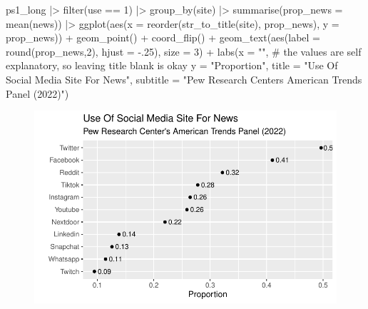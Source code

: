 \documentclass[
  letterpaper,
  DIV=11,
  numbers=noendperiod]{scrartcl}
\newenvironment{Shaded}{\begin{snugshade}}{\end{snugshade}}
\newcommand{\AttributeTok}[1]{\textcolor[rgb]{0.40,0.45,0.13}{#1}}
\newcommand{\CommentTok}[1]{\textcolor[rgb]{0.37,0.37,0.37}{#1}}
\newcommand{\DecValTok}[1]{\textcolor[rgb]{0.68,0.00,0.00}{#1}}
\newcommand{\FunctionTok}[1]{\textcolor[rgb]{0.28,0.35,0.67}{#1}}
\newcommand{\NormalTok}[1]{\textcolor[rgb]{0.00,0.23,0.31}{#1}}
\newcommand{\SpecialCharTok}[1]{\textcolor[rgb]{0.37,0.37,0.37}{#1}}
\newcommand{\StringTok}[1]{\textcolor[rgb]{0.13,0.47,0.30}{#1}}
\begin{document}
\begin{Shaded}
\begin{Highlighting}[]
\NormalTok{ps1\_long }\SpecialCharTok{|\textgreater{}} 
  \FunctionTok{filter}\NormalTok{(use }\SpecialCharTok{==} \DecValTok{1}\NormalTok{) }\SpecialCharTok{|\textgreater{}} 
  \FunctionTok{group\_by}\NormalTok{(site) }\SpecialCharTok{|\textgreater{}} 
  \FunctionTok{summarise}\NormalTok{(}\AttributeTok{prop\_news =} \FunctionTok{mean}\NormalTok{(news)) }\SpecialCharTok{|\textgreater{}} 
  \FunctionTok{ggplot}\NormalTok{(}\FunctionTok{aes}\NormalTok{(}\AttributeTok{x =} \FunctionTok{reorder}\NormalTok{(}\FunctionTok{str\_to\_title}\NormalTok{(site), prop\_news), }
             \AttributeTok{y =}\NormalTok{ prop\_news)) }\SpecialCharTok{+} 
  \FunctionTok{geom\_point}\NormalTok{() }\SpecialCharTok{+}
  \FunctionTok{coord\_flip}\NormalTok{() }\SpecialCharTok{+}
  \FunctionTok{geom\_text}\NormalTok{(}\FunctionTok{aes}\NormalTok{(}\AttributeTok{label =} \FunctionTok{round}\NormalTok{(prop\_news,}\DecValTok{2}\NormalTok{), }\AttributeTok{hjust =} \SpecialCharTok{{-}}\NormalTok{.}\DecValTok{25}\NormalTok{), }\AttributeTok{size =} \DecValTok{3}\NormalTok{) }\SpecialCharTok{+}
  \FunctionTok{labs}\NormalTok{(}\AttributeTok{x =} \StringTok{""}\NormalTok{, }\CommentTok{\# the values are self explanatory, so leaving title blank is okay}
       \AttributeTok{y =} \StringTok{"Proportion"}\NormalTok{,}
       \AttributeTok{title =} \StringTok{"Use Of Social Media Site For News"}\NormalTok{,}
       \AttributeTok{subtitle =} \StringTok{"Pew Research Center\textquotesingle{}s American Trends Panel (2022)"}\NormalTok{) }
\end{Highlighting}
\end{Shaded}

\begin{figure}[H]

{\centering \includegraphics{ps1_ml_files/figure-pdf/unnamed-chunk-24-1.pdf}

}

\end{figure}
\end{document}
